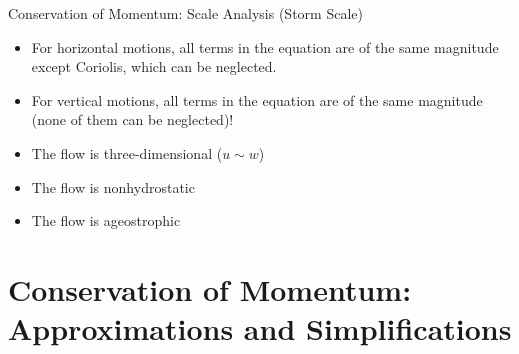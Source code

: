 \begin{frame}{Conservation of Momentum: Scale Analysis (Storm Scale)}

\begin{itemize}
	\item For horizontal motions, all terms in the equation are of the same magnitude except Coriolis, which can be neglected.
	\item For vertical motions, all terms in the equation are of the same magnitude (none of them can be neglected)!
	\item The flow is three-dimensional ($u \sim w$)
	\item The flow is nonhydrostatic
	\item The flow is ageostrophic
\end{itemize}

\end{frame}

\section{Conservation of Momentum: Approximations and Simplifications} %
